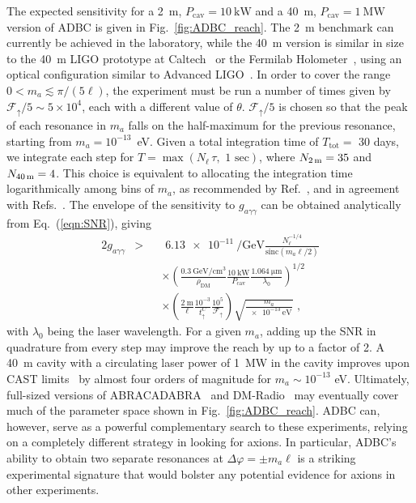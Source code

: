 \documentclass[aps,prd,nofootinbib,twocolumn,superscriptaddress,preprintnumbers,letterpaper, longbibliography]{revtex4-1}
\begin{document}
The expected sensitivity for a \SI{2}{\meter}, $P_\text{cav} = \SI{10}{\kilo\watt}$ and a \SI{40}{m}, $P_\text{cav} = \SI{1}{\mega\watt}$ version of ADBC is given in Fig.~\ref{fig:ADBC_reach}. The \SI{2}{\meter} benchmark can currently be achieved in the laboratory, while the \SI{40}{\meter} version is similar in size to the \SI{40}{\meter} LIGO prototype at Caltech~\cite{Abramovici:1996dz} or the Fermilab Holometer~\cite{Chou:2015sle}, using an optical configuration similar to Advanced LIGO~\cite{TheLIGOScientific:2014jea}.  In order to cover the range $0 < m_a \lesssim \pi/(5\ell)$, the experiment must be run a number of times given by $\mathcal{F}_\uparrow/5 \sim 5 \times 10^{4}$, each with a different value of $\theta$.
$\mathcal{F}_\uparrow/5$ is chosen so that the peak of each resonance in $m_a$ falls on the half-maximum for the previous resonance, starting from $m_a = 10^{-13}$~eV. Given a total integration time of $T_\text{tot} = $ 30 days, we integrate each step for $T = \max(N_\ell \, \tau, \text{ 1 sec})$, where $N_\text{2\,m} = 35$ and $N_\text{40\,m} = 4$. This choice is equivalent to allocating the integration time logarithmically among bins of $m_a$, as recommended by Ref.~\cite{Chaudhuri:2018rqn}, and in agreement with Refs.~\cite{Chaudhuri:2014dla,Kahn:2016aff}. The envelope of the sensitivity to $g_{a\gamma\gamma}$ can be obtained analytically from Eq.~(\ref{eqn:SNR}), giving
\begin{alignat}{2}
	g_{a\gamma\gamma} &> && \,\, \SI{6.13e-11}{\per\giga\eV} \frac{N_\ell^{-1/4}}{\text{sinc}(m_a \ell/2)} \nonumber \\
    & && \times \left(\frac{\SI{0.3}{\giga\eV \per \centi\meter\cubed}}{\rho_\text{DM}} \frac{\SI{10}{\kilo\watt}}{P_\text{cav}} \frac{\SI{1.064}{\micro\meter}}{\lambda_0} \right)^{1/2} \nonumber \\
    & && \times \left( \frac{\SI{2}{\meter}}{\ell} \frac{10^{-3}}{t_\uparrow^C} \frac{10^5}{\mathcal{F}_\uparrow} \right) \sqrt{\frac{m_a}{\SI{e-13}{\eV}}} \,\,,
\end{alignat}
with $\lambda_0$ being the laser wavelength. For a given $m_a$, adding up the SNR in quadrature from every step may improve the reach by up to a factor of 2. A  \SI{40}{m} cavity with a circulating laser power of \SI{1}{MW} in the cavity improves upon CAST limits~\cite{Anastassopoulos:2017ftl} by almost four orders of magnitude for  $m_a \sim 10^{-13}$ eV. Ultimately, full-sized versions of ABRACADABRA~\cite{Kahn:2016aff,Ouellet:2018beu,Ouellet:2019tlz} and DM-Radio~\cite{Chaudhuri:2014dla,Battesti:2018bgc} may eventually cover much of the parameter space shown in Fig.~\ref{fig:ADBC_reach}. ADBC can, however, serve as a powerful complementary search to these experiments, relying on a completely different strategy in looking for axions. In particular, ADBC's ability to obtain two separate resonances at $\Delta \varphi = \pm m_a \ell$ is a striking experimental signature that would bolster any potential evidence for axions in other experiments.
\end{document}
